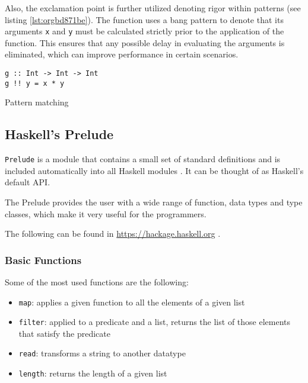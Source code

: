 \documentclass[a4paper, titlepage, twoside]{article}
\begin{document}
Also, the exclamation point is further utilized denoting rigor within patterns (see listing \ref{lst:orgbd871be}). The function uses a bang pattern to denote that its arguments \texttt{x} and \texttt{y} must be calculated strictly prior to the application of the function. This ensures that any possible delay in evaluating the arguments is eliminated, which can improve performance in certain scenarios.

\begin{listing}[htbp]
\begin{verbatim}
g :: Int -> Int -> Int
g !! y = x * y
\end{verbatim}
\caption{\label{lst:orgbd871be}Pattern matching}
\end{listing}

\subsection{Haskell's Prelude}
\label{sec:org63430ea}

\texttt{Prelude} is a module that contains a small set of standard definitions and is included automatically into all Haskell modules \autocite{haskellwikiHaskellHaskellWiki2023}. It can be thought of as Haskell's default API.

The Prelude provides the user with a wide range of function, data types and type classes, which make it very useful for the programmers.

The following can be found in \url{https://hackage.haskell.org} \autocite{hackagePrelude2023}.

\subsubsection{Basic Functions}
\label{sec:org449866a}

Some of the most used functions are the following:

\begin{itemize}
\item \texttt{map}: applies a given function to all the elements of a given list

\item \texttt{filter}: applied to a predicate and a list, returns the list of those elements that satisfy the predicate

\item \texttt{read}: transforms a string to another datatype

\item \texttt{length}: returns the length of a given list
\end{itemize}
\end{document}
